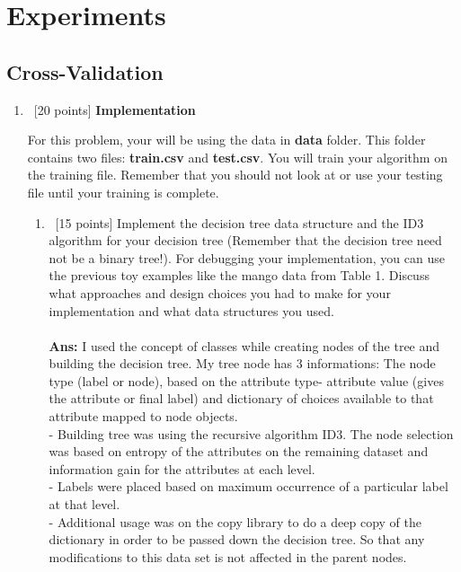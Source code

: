 \documentclass[12pt, fullpage,letterpaper]{article}
\begin{document}
\section{Experiments}
\label{sec:q3}

\subsection*{Cross-Validation}
\begin{enumerate}
    \item~[20 points] \textbf{Implementation}

        For this problem, your will be using the data in \textbf{data} folder.
        This folder contains two files: \textbf{train.csv} and \textbf{test.csv}.
        You will train your algorithm on the training file.
        Remember that you should not look at or use your testing file until your training is complete.
    \begin{enumerate}
        \item~[15 points] Implement the decision tree data structure and the ID3 algorithm for your decision tree (Remember that the decision tree need not be a binary tree!).
        For debugging your implementation, you can use the previous toy examples like the mango data from Table 1.
        Discuss what approaches and design choices you had to make for your implementation and what data structures you used.\\\\
        \textbf{Ans: }I used the concept of classes while creating nodes of the tree and building the decision tree. My tree node has 3 informations: The node type (label or node), based on the attribute type- attribute value (gives the attribute or final label) and dictionary of choices available to that attribute mapped to node objects. \\- Building tree was using the recursive algorithm ID3. The node selection was based on entropy of the attributes on the remaining dataset and information gain for the attributes at each level. \\- Labels were placed based on maximum occurrence of a particular label at that level. \\- Additional usage was on the copy library to do a deep copy of the dictionary in order to be passed down the decision tree. So that any modifications to this data set is not affected in the parent nodes. 
        

\end{enumerate}
\end{enumerate}
\end{document}
